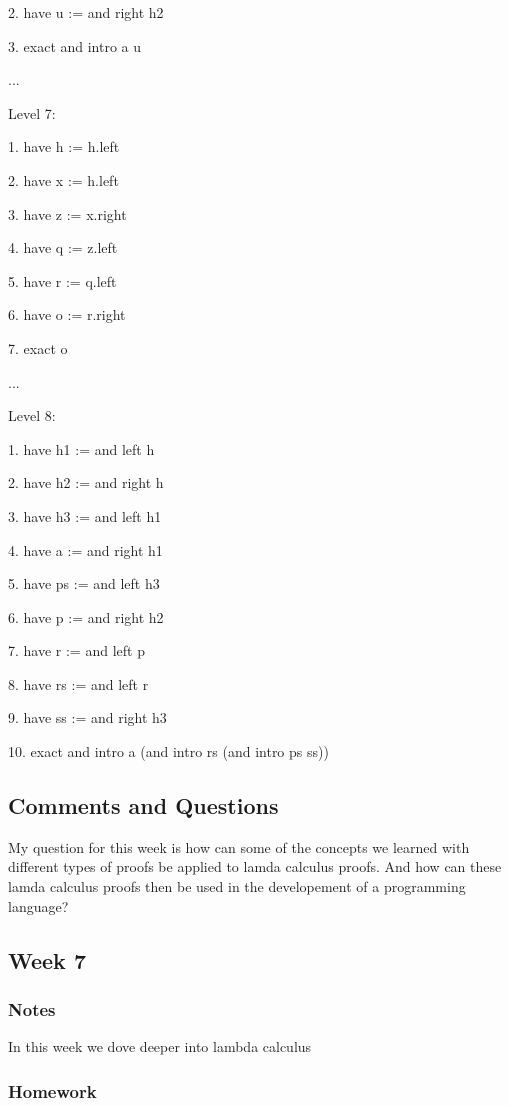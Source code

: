 \documentclass{article}
\theoremstyle{theorem}
\theoremstyle{definition}
\theoremstyle{remark}
\begin{document}
2. have u := and right h2

3. exact and intro a u

... 

Level 7:

1. have h := h.left

2. have x := h.left

3. have z := x.right

4. have q := z.left

5. have r := q.left

6. have o := r.right

7. exact o

... 

Level 8:

1. have h1 := and left h

2. have h2 := and right h

3. have h3 := and left h1

4. have a := and right h1

5. have ps := and left h3

6. have p := and right h2

7. have r := and left p

8. have rs := and left r

9. have ss := and right h3

10. exact and intro a (and intro rs (and intro ps ss))

\subsection*{Comments and Questions}

My question for this week is how can some of the concepts we learned with different types of proofs be applied to lamda calculus proofs. And how can these lamda calculus proofs then be used in the developement of a programming language?

\subsection{Week 7}

\subsubsection*{Notes}
In this week we dove deeper into lambda calculus

\subsubsection*{Homework}
\end{document}
